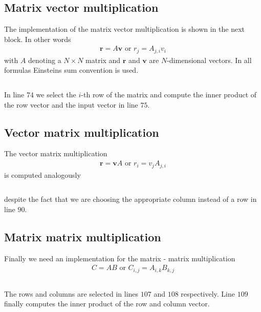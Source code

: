 \subsection{Matrix vector multiplication}
The implementation of the matrix vector multiplication is shown in the next
block. In other words
\begin{align}
 \mathbf{r} = A\mathbf{v} \mbox{ or } r_j = A_{j,i}v_i
\end{align}
with $A$ denoting a $N\times N$ matrix and $\mathbf{r}$ and $\mathbf{v}$ are
$N$-dimensional vectors. In all formulas Einsteins sum convention is used.
\inputminted[fontsize=\small,
             linenos,
             firstline=64,
             lastline=80,
             firstnumber=64,
             frame=lines,
             label=examples/array\_arithmetic3.cpp]
{cpp}{../examples/array_arithmetic3.cpp}
In line $74$ we select the $i$-th row of the matrix and compute the inner
product of the row vector and the input vector in line $75$. 

\subsection{Vector matrix multiplication}
The vector matrix multiplication
\begin{align}
 \mathbf{r} = \mathbf{v}A\mbox{ or } r_i = v_j A_{j,i}
\end{align}
is computed analogously 
\inputminted[fontsize=\small,
             linenos,
             firstline=80,
             lastline=95,
             firstnumber=80,
             frame=lines,
             label=examples/array\_arithmetic3.cpp]
{cpp}{../examples/array_arithmetic3.cpp}
despite the fact that we are choosing the appropriate column instead of a row in 
line $90$. 

\subsection{Matrix matrix multiplication}
Finally we need an implementation for the matrix - matrix
multiplication
\begin{align}
C = AB \mbox{ or } C_{i,j} = A_{i,k}B_{k,j}
\end{align}
\inputminted[fontsize=\small,
             linenos,
             firstline=96,
             lastline=115,
             firstnumber=96,
             frame=lines,
             label=examples/array\_arithmetics3.cpp]
{cpp}{../examples/array_arithmetic3.cpp}
The rows and columns are selected in lines $107$ and $108$ respectively. 
Line $109$ finally computes the inner product of the row and column vector.

